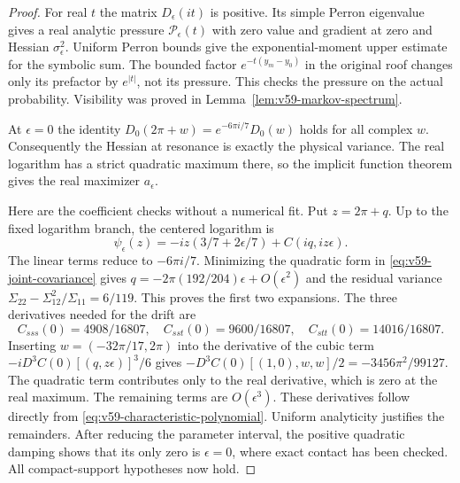 \begin{proof}
For real $t$ the matrix $D_\epsilon(it)$ is positive. Its simple Perron
eigenvalue gives a real analytic pressure $\mathscr P_\epsilon(t)$
with zero value and gradient at zero and Hessian $\sigma_\epsilon^2$.
Uniform Perron bounds give the exponential-moment upper estimate for
the symbolic sum. The bounded factor $e^{-t(y_m-y_0)}$ in the original
roof changes only its prefactor by $e^{|t|}$, not its pressure. This
checks the pressure on the actual probability. Visibility was proved in
Lemma~\ref{lem:v59-markov-spectrum}.

At $\epsilon=0$ the identity
$D_0(2\pi+w)=e^{-6\pi i/7}D_0(w)$ holds for all complex $w$.
Consequently the Hessian at resonance is exactly the physical variance.
The real logarithm has a strict quadratic maximum there, so the implicit
function theorem gives the real maximizer $a_\epsilon$.

Here are the coefficient checks without a numerical fit. Put
$z=2\pi+q$. Up to the fixed logarithm branch, the centered logarithm is
\[
 \psi_\epsilon(z)=-iz(3/7+2\epsilon/7)
                                    +C(iq,iz\epsilon).
\]
The linear terms reduce to $-6\pi i/7$. Minimizing the quadratic
form in \eqref{eq:v59-joint-covariance} gives
$q=-2\pi(192/204)\epsilon+O(\epsilon^2)$ and the residual variance
$\Sigma_{22}-\Sigma_{12}^2/\Sigma_{11}=6/119$.
This proves the first two expansions. The three derivatives needed for
the drift are
\[
 C_{sss}(0)=4908/16807,\quad C_{sst}(0)=9600/16807,
                       \quad C_{stt}(0)=14016/16807.
\]
Inserting $w=(-32\pi/17,2\pi)$ into the derivative of the cubic term
$-iD^3C(0)[(q,z\epsilon)]^3/6$ gives
$-D^3C(0)[(1,0),w,w]/2=-3456\pi^2/99127$.
The quadratic term contributes only to the real derivative, which is
zero at the real maximum. The remaining terms are $O(\epsilon^3)$.
These derivatives follow directly from
\eqref{eq:v59-characteristic-polynomial}. Uniform analyticity justifies
the remainders. After reducing the parameter interval, the positive
quadratic damping shows that its only zero is $\epsilon=0$, where exact
contact has been checked. All compact-support hypotheses now hold.
\end{proof}
